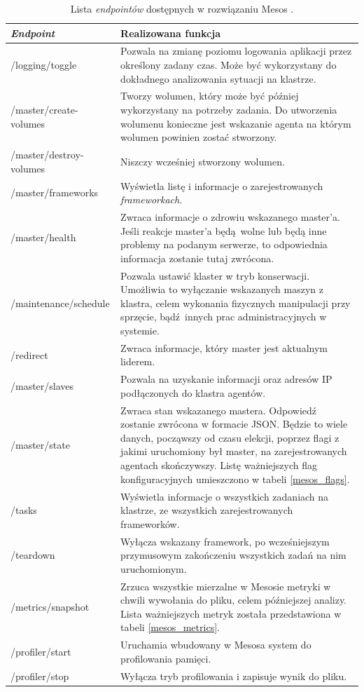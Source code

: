 \documentclass[10pt,a4paper,titlepage,twoside]{report}
\begin{document}
\begin{table}[!htbp]
\caption{Lista \textit{endpointów} dostępnych w rozwiązaniu Mesos \cite{ad38}.}
\label{mesos_endpoints}
\centering
\begin{tabular}{|p{4cm}|p{10cm}|}
  \hline
  \textbf{\textit{Endpoint}} & \textbf{Realizowana funkcja} \\
  \hline
  /logging/toggle & Pozwala na zmianę poziomu logowania aplikacji przez określony zadany czas. Może być wykorzystany do dokładnego analizowania sytuacji na klastrze.\\
  \hline
  /master/create-volumes & Tworzy wolumen, który może być później wykorzystany na potrzeby zadania. Do utworzenia wolumenu konieczne jest wskazanie agenta na którym wolumen powinien zostać stworzony. \\
  \hline
  /master/destroy-volumes & Niszczy wcześniej stworzony wolumen. \\
  \hline
  /master/frameworks & Wyświetla listę i informacje o zarejestrowanych \textit{frameworkach}. \\
  \hline
  /master/health & Zwraca informacje o zdrowiu wskazanego master'a. Jeśli reakcje master'a będą wolne lub będą inne problemy na podanym serwerze, to odpowiednia informacja zostanie tutaj zwrócona. \\
  \hline
  /maintenance/schedule & Pozwala ustawić klaster w tryb konserwacji. Umożliwia to wyłączanie wskazanych maszyn z klastra, celem wykonania fizycznych manipulacji przy sprzęcie, bądź innych prac administracyjnych w systemie. \\
  \hline
  /redirect & Zwraca informacje, który master jest aktualnym liderem. \\
  \hline
  /master/slaves & Pozwala na uzyskanie informacji oraz adresów IP podłączonych do klastra agentów. \\
  \hline
  /master/state & Zwraca stan wskazanego mastera. Odpowiedź zostanie zwrócona w formacie JSON. Będzie to wiele danych, począwszy od czasu elekcji, poprzez flagi z jakimi uruchomiony był master, na zarejestrowanych agentach skończywszy. Listę ważniejszych flag konfiguracyjnych umieszczono w tabeli \ref{mesos_flags}. \\
  \hline
  /tasks & Wyświetla informacje o wszystkich zadaniach na klastrze, ze wszystkich zarejestrowanych frameworków. \\
  \hline
  /teardown & Wyłącza wskazany framework, po wcześniejszym przymusowym zakończeniu wszystkich zadań na nim uruchomionym. \\
  \hline
  /metrics/snapshot & Zrzuca wszystkie mierzalne w Mesosie metryki w chwili wywołania do pliku, celem późniejszej analizy. Lista ważniejszych metryk została przedstawiona w tabeli \ref{mesos_metrics}.\\
  \hline
  /profiler/start & Uruchamia wbudowany w Mesosa system do profilowania pamięci. \\
  \hline
  /profiler/stop & Wyłącza tryb profilowania i zapisuje wynik do pliku. \\
  \hline
\end{tabular}
\end{table}
\end{document}
